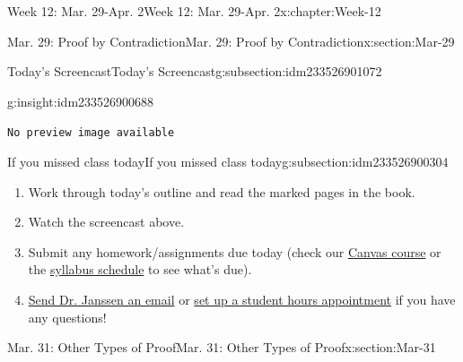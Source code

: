 \documentclass[oneside,10pt,]{book}
\newcommand{\mono}[1]{\texttt{#1}}
\numberwithin{equation}{section}
\newlength{\qrsize}
\newlength{\previewwidth}
\begin{document}
\begin{chapterptx}{Week 12: Mar. 29-Apr. 2}{}{Week 12: Mar. 29-Apr. 2}{}{}{x:chapter:Week-12}
\begin{sectionptx}{Mar. 29: Proof by Contradiction}{}{Mar. 29: Proof by Contradiction}{}{}{x:section:Mar-29}
\typeout{************************************************}
%
\begin{subsectionptx}{Today's Screencast}{}{Today's Screencast}{}{}{g:subsection:idm233526901072}
\begin{insight}{}{g:insight:idm233526900688}%
\setlength{\qrsize}{9em}
\setlength{\previewwidth}{\linewidth}
\addtolength{\previewwidth}{-\qrsize}
\begin{tcbraster}[raster columns=2, raster column skip=1pt, raster halign=center, raster force size=false, raster left skip=0pt, raster right skip=0pt]%
\begin{tcolorbox}[previewstyle, width=\previewwidth]%
\mono{No preview image available}%
\end{tcolorbox}%
\begin{tcolorbox}[qrstyle]%
[QR LINK]\end{tcolorbox}%
\end{tcbraster}%
\end{insight}
\end{subsectionptx}
%
%
\typeout{************************************************}
\typeout{************************************************}
%
\begin{subsectionptx}{If you missed class today}{}{If you missed class today}{}{}{g:subsection:idm233526900304}
%
\begin{enumerate}
\item{}Work through today's outline and read the marked pages in the book.%
\item{}Watch the screencast above.%
\item{}Submit any homework\slash{}assignments due today (check our \href{https://dordt.instructure.com/courses/3110050}{Canvas course} or the \href{https://prof.mkjanssen.org/ds/index.html\#schedule}{syllabus schedule} to see what's due).%
\item{}\href{mailto:mike.janssen@dordt.edu}{Send Dr. Janssen an email} or \href{https://calendly.com/mkjanssen/student-hours}{set up a student hours appointment} if you have any questions!%
\end{enumerate}
\end{subsectionptx}
\end{sectionptx}
%
%
\typeout{************************************************}
\typeout{************************************************}
%
\begin{sectionptx}{Mar. 31: Other Types of Proof}{}{Mar. 31: Other Types of Proof}{}{}{x:section:Mar-31}

\end{sectionptx}
\end{chapterptx}
\end{document}
